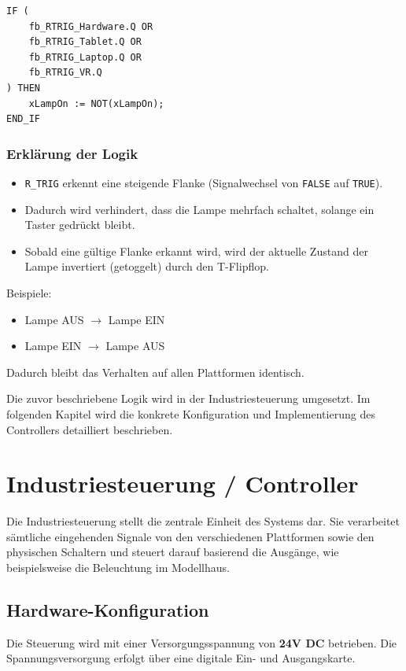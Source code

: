 \documentclass[a4paper,12pt]{article}
\begin{document}
\begin{verbatim}
IF (
    fb_RTRIG_Hardware.Q OR
    fb_RTRIG_Tablet.Q OR
    fb_RTRIG_Laptop.Q OR
    fb_RTRIG_VR.Q
) THEN
    xLampOn := NOT(xLampOn);
END_IF
\end{verbatim}

\subsubsection*{Erklärung der Logik}
\begin{itemize}
    \item \texttt{R\_TRIG} erkennt eine steigende Flanke (Signalwechsel von \texttt{FALSE} auf \texttt{TRUE}).
    \item Dadurch wird verhindert, dass die Lampe mehrfach schaltet, solange ein Taster gedrückt bleibt.
    \item Sobald eine gültige Flanke erkannt wird, wird der aktuelle Zustand der Lampe invertiert (getoggelt) durch den T-Flipflop.
\end{itemize}

Beispiele:
\begin{itemize}
    \item Lampe AUS $\rightarrow$ Lampe EIN
    \item Lampe EIN $\rightarrow$ Lampe AUS
\end{itemize}
Dadurch bleibt das Verhalten auf allen Plattformen identisch.

Die zuvor beschriebene Logik wird in der Industriesteuerung umgesetzt. 
Im folgenden Kapitel wird die konkrete Konfiguration und Implementierung des Controllers detailliert beschrieben.

\section{Industriesteuerung / Controller}

Die Industriesteuerung stellt die zentrale Einheit des Systems dar. 
Sie verarbeitet sämtliche eingehenden Signale von den verschiedenen Plattformen sowie den physischen Schaltern und steuert darauf basierend die Ausgänge, wie beispielsweise die Beleuchtung im Modellhaus. 

\subsection{Hardware-Konfiguration}

Die Steuerung wird mit einer Versorgungsspannung von \textbf{24V DC} betrieben. 
Die Spannungsversorgung erfolgt über eine digitale Ein- und Ausgangskarte.
\end{document}
